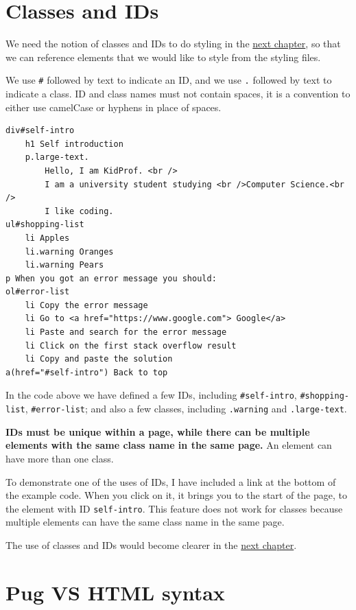 \section{Classes and IDs}
\label{sec:classesids}

We need the notion of classes and IDs to do styling in the \hyperref[sec:ch6]{next chapter}, so that we can reference elements that we would like to style from the styling files.

We use \texttt{\#} followed by text to indicate an ID, and we use \texttt{.} followed by text to indicate a class. ID and class names must not contain spaces, it is a convention to either use camelCase or hyphens in place of spaces.
\vspace{6mm}

\begin{lstlisting}[language=pug]
div#self-intro
	h1 Self introduction
	p.large-text.
		Hello, I am KidProf. <br />
		I am a university student studying <br />Computer Science.<br />
		I like coding.
ul#shopping-list
	li Apples
	li.warning Oranges
	li.warning Pears
p When you got an error message you should:
ol#error-list
	li Copy the error message
	li Go to <a href="https://www.google.com"> Google</a>
	li Paste and search for the error message
	li Click on the first stack overflow result
	li Copy and paste the solution
a(href="#self-intro") Back to top
\end{lstlisting}

In the code above we have defined a few IDs, including \texttt{\#self-intro}, \texttt{\#shopping-list}, \texttt{\#error-list}; and also a few classes, including \texttt{.warning} and \texttt{.large-text}. 
\vspace{6mm}

\textbf{IDs must be unique within a page, while there can be multiple elements with the same class name in the same page.} An element can have more than one class.
\vspace{6mm}

To demonstrate one of the uses of IDs, I have included a link at the bottom of the example code. When you click on it, it brings you to the start of the page, to the element with ID \texttt{self-intro}. This feature does not work for classes because multiple elements can have the same class name in the same page.

The use of classes and IDs would become clearer in the \hyperref[sec:ch6]{next chapter}.

\section{Pug VS HTML syntax}
\label{sec:pugvshtml}

